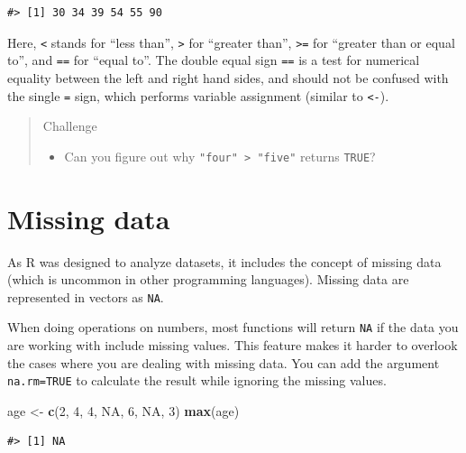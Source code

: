 \documentclass[
]{book}
\newenvironment{Shaded}{\begin{snugshade}}{\end{snugshade}}
\newcommand{\ConstantTok}[1]{\textcolor[rgb]{0.56,0.35,0.01}{#1}}
\newcommand{\DecValTok}[1]{\textcolor[rgb]{0.00,0.00,0.81}{#1}}
\newcommand{\FunctionTok}[1]{\textcolor[rgb]{0.13,0.29,0.53}{\textbf{#1}}}
\newcommand{\NormalTok}[1]{#1}
\newcommand{\OtherTok}[1]{\textcolor[rgb]{0.56,0.35,0.01}{#1}}
\providecommand{\tightlist}{%
  \setlength{\itemsep}{0pt}\setlength{\parskip}{0pt}}
\begin{document}
\begin{verbatim}
#> [1] 30 34 39 54 55 90
\end{verbatim}

Here, \texttt{\textless{}} stands for ``less than'', \texttt{\textgreater{}} for ``greater than'', \texttt{\textgreater{}=} for ``greater than
or equal to'', and \texttt{==} for ``equal to''. The double equal sign \texttt{==} is a test for
numerical equality between the left and right hand sides, and should not be
confused with the single \texttt{=} sign, which performs variable assignment (similar
to \texttt{\textless{}-}).

\begin{quote}
Challenge

\begin{itemize}
\tightlist
\item
  Can you figure out why \texttt{"four"\ \textgreater{}\ "five"} returns \texttt{TRUE}?
\end{itemize}
\end{quote}

\hypertarget{missing-data}{%
\section{Missing data}\label{missing-data}}

As R was designed to analyze datasets, it includes the concept of missing data
(which is uncommon in other programming languages). Missing data are represented
in vectors as \texttt{NA}.

When doing operations on numbers, most functions will return \texttt{NA} if the data
you are working with include missing values. This feature
makes it harder to overlook the cases where you are dealing with missing data.
You can add the argument \texttt{na.rm=TRUE} to calculate the result while ignoring
the missing values.

\begin{Shaded}
\begin{Highlighting}[]
\NormalTok{age }\OtherTok{\textless{}{-}} \FunctionTok{c}\NormalTok{(}\DecValTok{2}\NormalTok{, }\DecValTok{4}\NormalTok{, }\DecValTok{4}\NormalTok{, }\ConstantTok{NA}\NormalTok{, }\DecValTok{6}\NormalTok{, }\ConstantTok{NA}\NormalTok{, }\DecValTok{3}\NormalTok{)}
\FunctionTok{max}\NormalTok{(age)}
\end{Highlighting}
\end{Shaded}

\begin{verbatim}
#> [1] NA
\end{verbatim}
\end{document}
